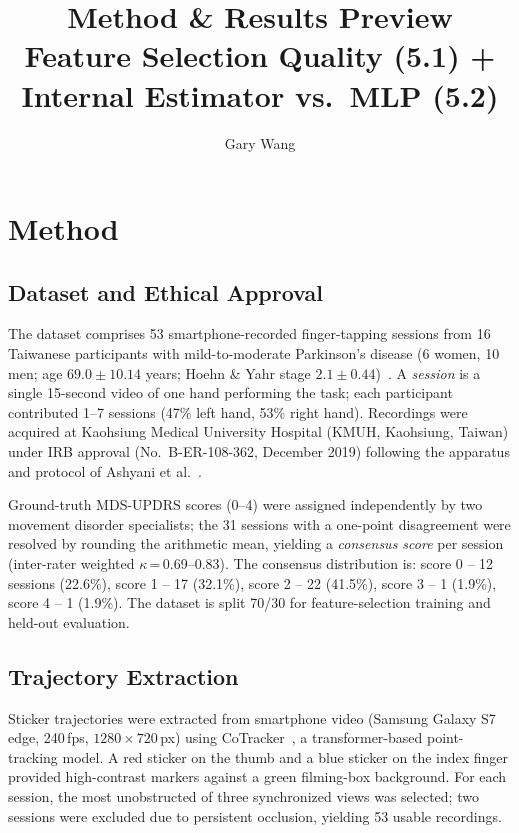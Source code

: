 \documentclass[12pt, a4paper]{article}
\begin{document}
\title{Method \& Results Preview\\
\small{Feature Selection Quality (5.1) + Internal Estimator vs.\ MLP (5.2)}}
\author{Gary Wang}
\maketitle

\section{Method}

\subsection{Dataset and Ethical Approval}

The dataset comprises 53 smartphone-recorded finger-tapping sessions from
16 Taiwanese participants with mild-to-moderate Parkinson's disease (6 women, 10 men;
age $69.0 \pm 10.14$ years; Hoehn \& Yahr stage $2.1 \pm 0.44$)~\cite{goetz2004movement}.
A \emph{session} is a single 15-second video of one hand performing the task; each
participant contributed 1--7 sessions (47\% left hand, 53\% right hand).
Recordings were acquired at Kaohsiung Medical University Hospital (KMUH, Kaohsiung,
Taiwan) under IRB approval (No.~B-ER-108-362, December 2019) following the apparatus
and protocol of Ashyani et al.~\cite{ashyani2022digitization}.

Ground-truth MDS-UPDRS scores (0--4) were assigned independently by two movement
disorder specialists; the 31 sessions with a one-point disagreement were resolved by
rounding the arithmetic mean, yielding a \emph{consensus score} per session
(inter-rater weighted $\kappa$\,=\,0.69--0.83).
The consensus distribution is: score 0 -- 12 sessions (22.6\%), score 1 -- 17 (32.1\%),
score 2 -- 22 (41.5\%), score 3 -- 1 (1.9\%), score 4 -- 1 (1.9\%).
The dataset is split 70/30 for feature-selection training and held-out evaluation.

\subsection{Trajectory Extraction}

Sticker trajectories were extracted from smartphone video (Samsung Galaxy S7 edge,
240\,fps, $1280 \times 720$\,px) using CoTracker~\cite{karaev2023cotracker}, a
transformer-based point-tracking model.
A red sticker on the thumb and a blue sticker on the index finger provided
high-contrast markers against a green filming-box background.
For each session, the most unobstructed of three synchronized views was selected;
two sessions were excluded due to persistent occlusion, yielding 53 usable recordings.
\end{document}
